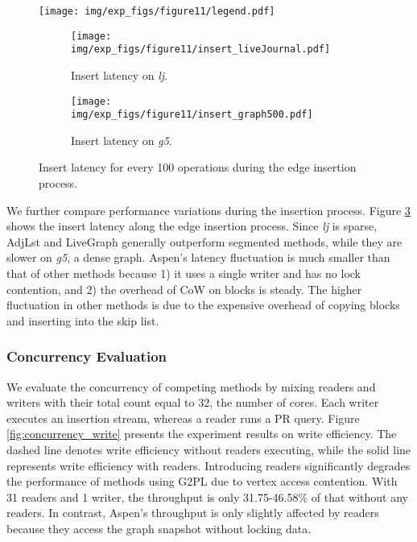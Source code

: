 \begin{figure}[h]
    \setlength{\abovecaptionskip}{0pt}
    \setlength{\belowcaptionskip}{0pt}
    \captionsetup[subfigure]{aboveskip=0pt,belowskip=0pt}
    \centering
    \texttt{[image: img/exp\_figs/figure11/legend.pdf]}\\
    \begin{subfigure}[t]{0.32\textwidth}
        \centering
        \texttt{[image: img/exp\_figs/figure11/insert\_liveJournal.pdf]}
        \caption{Insert latency on \emph{lj}.}
        \label{fig:insert_latency_lj}
    \end{subfigure}
    \begin{subfigure}[t]{0.32\textwidth}
        \centering
        \texttt{[image: img/exp\_figs/figure11/insert\_graph500.pdf]}
        \caption{Insert latency on \emph{g5}.}
        \label{fig:insert_latency_g5}
    \end{subfigure}
    \caption{Insert latency for every 100 operations during the edge insertion process.}
    \label{fig:insert_latency_edge_insertion}
\end{figure}


We further compare performance variations during the insertion process. Figure \ref{fig:insert_latency_edge_insertion} shows the insert latency along the edge insertion process. Since \emph{lj} is sparse, AdjLst and LiveGraph generally outperform segmented methods, while they are slower on \emph{g5}, a dense graph. Aspen’s latency fluctuation is much smaller than that of other methods because 1) it uses a single writer and has no lock contention, and 2) the overhead of CoW on blocks is steady. The higher fluctuation in other methods is due to the expensive overhead of copying blocks and inserting into the skip list.


\subsubsection{Concurrency Evaluation} 

We evaluate the concurrency of competing methods by mixing readers and writers with their total count equal to 32, the number of cores. Each writer executes an insertion stream, whereas a reader runs a PR query. Figure \ref{fig:concurrency_write} presents the experiment results on write efficiency. The dashed line denotes write efficiency without readers executing, while the solid line represents write efficiency with readers. Introducing readers significantly degrades the performance of methods using G2PL due to vertex access contention. With 31 readers and 1 writer, the throughput is only 31.75-46.58\% of that without any readers. In contrast, Aspen’s throughput is only slightly affected by readers because they access the graph snapshot without locking data.

